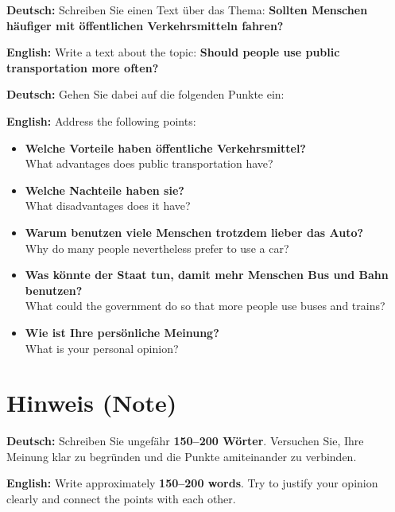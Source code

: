 \documentclass[a4paper,11pt]{article}
\newcommand{\GermanText}[1]{\textbf{Deutsch: }#1\par}
\newcommand{\EnglishText}[1]{{\small\color{SoftGray}\textbf{English: }#1\par}}
\begin{document}
      \begin{taskbox}
         \GermanText{Schreiben Sie einen Text über das Thema: \textbf{Sollten Menschen häufiger mit öffentlichen Verkehrsmitteln fahren?}}
         \EnglishText{Write a text about the topic: \textbf{Should people use public transportation more often?}}

         \vspace{0.5em}

         \GermanText{Gehen Sie dabei auf die folgenden Punkte ein:}
         \EnglishText{Address the following points:}

         \begin{itemize}
            \item \textbf{Welche Vorteile haben öffentliche Verkehrsmittel?}\\
            {\small\color{SoftGray}What advantages does public transportation have?}

            \item \textbf{Welche Nachteile haben sie?}\\
            {\small\color{SoftGray}What disadvantages does it have?}

            \item \textbf{Warum benutzen viele Menschen trotzdem lieber das Auto?}\\
            {\small\color{SoftGray}Why do many people nevertheless prefer to use a car?}

            \item \textbf{Was könnte der Staat tun, damit mehr Menschen Bus und Bahn benutzen?}\\
            {\small\color{SoftGray}What could the government do so that more people use buses and trains?}

            \item \textbf{Wie ist Ihre persönliche Meinung?}\\
            {\small\color{SoftGray}What is your personal opinion?}
         \end{itemize}
      \end{taskbox}

   \section{Hinweis \textnormal{(Note)}}

      \begin{infobox}
         \GermanText{Schreiben Sie ungefähr \textbf{150--200 Wörter}. Versuchen Sie, Ihre Meinung klar zu begründen und die Punkte amiteinander zu verbinden.}
         \EnglishText{Write approximately \textbf{150--200 words}. Try to justify your opinion clearly and connect the points with each other.}
      \end{infobox}
\end{document}
